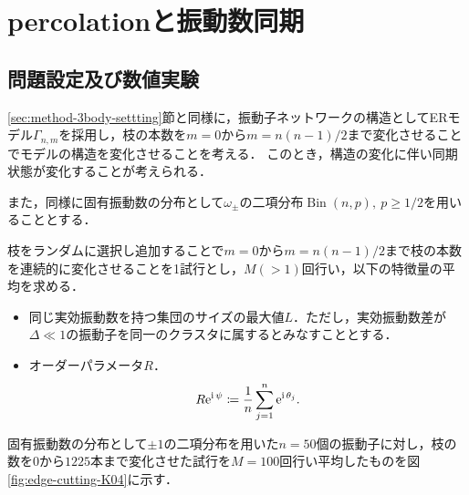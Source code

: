 \documentclass[../main]{subfiles}
\begin{document}
\chapter{percolationと振動数同期}
\label{chap:percolation}
\section{問題設定及び数値実験}
\ref{sec:method-3body-settting}節と同様に，振動子ネットワークの構造としてERモデル$\Gamma_{n,m}$を採用し，枝の本数を$m=0$から$m=n(n-1)/2$まで変化させることでモデルの構造を変化させることを考える．
このとき，構造の変化に伴い同期状態が変化することが考えられる．

また，同様に固有振動数の分布として$\omega_\pm$の二項分布$\operatorname{Bin}(n,p),\ p\geq 1/2$を用いることとする．

枝をランダムに選択し追加することで$m=0$から$m=n(n-1)/2$まで枝の本数を連続的に変化させることを1試行とし，$M(>1)$回行い，以下の特徴量の平均を求める．
\begin{itemize}
    \item 
    同じ実効振動数を持つ集団のサイズの最大値$L$．ただし，実効振動数差が$\Delta\ll 1$の振動子を同一のクラスタに属するとみなすこととする．
    \item
    オーダーパラメータ$R$．
    \begin{equation*}
        R\mathrm{e}^{{\mathrm i\,} \psi}\coloneqq\frac{1}{n}\sum_{j=1}^n\mathrm{e}^{{\mathrm i\,} \theta_j}.    
    \end{equation*}
\end{itemize}

固有振動数の分布として$\pm 1$の二項分布を用いた$n=50$個の振動子に対し，枝の数を$0$から$1225$本まで変化させた試行を$M=100$回行い平均したものを図\ref{fig:edge-cutting-K04}に示す．
\end{document}
